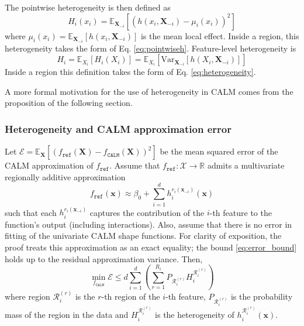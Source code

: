 The pointwise heterogeneity is then defined as 
\begin{equation}
H_i(x_i) = \mathbb{E}_{\mathbf{X}_{-i}}\left[\left(h(x_i, \mathbf{X}_{-i}) - \mu_i(x_i)\right)^2\right]
\end{equation}
where $\mu_i(x_i) = \mathbb{E}_{\mathbf{X}_{-i}}[h(x_i, \mathbf{X}_{-i})]$ is the mean local effect. Inside a region, this heterogeneity takes the form of Eq. \eqref{eq:pointwiseh}. Feature-level heterogeneity is 
\begin{equation}
H_i = \mathbb{E}_{X_i}\left[H_i(X_i)\right] = \mathbb{E}_{X_i}\left[\text{Var}_{\mathbf{X}_{-i}}[h(X_i, \mathbf{X}_{-i})]\right]
\end{equation}
Inside a region this definition takes the form of Eq. \eqref{eq:heterogeneity}.

A more formal motivation for the use of heterogeneity in CALM comes from the proposition of the following section.

\subsubsection{Heterogeneity and CALM approximation error}

\begin{proposition}
    Let $\mathcal{E} = \mathbb{E}_{\mathbf{X}}\left[\left(f_{\texttt{ref}}(\mathbf{X}) - f_{\texttt{CALM}}(\mathbf{X})\right)^2\right]$ be the mean squared error of the CALM approximation of $f_{\texttt{ref}}$. Assume that $f_{\texttt{ref}}: \mathcal{X} \to \mathbb{R}$ admits a multivariate regionally additive approximation
\begin{equation*}
f_{\texttt{ref}}(\mathbf{x}) \approx \beta_0 + \sum_{i = 1}^dh_i^{r_i(\mathbf{x}_{-i})}(\mathbf{x})
\end{equation*}
such that each $h_i^{r_i(\mathbf{x}_{-i})}$ captures the contribution of the $i$-th feature to the function's output (including interactions). Also, assume that there is no error in fitting of the univariate CALM shape functions. For clarity of exposition, the proof treats this approximation as an exact equality; the bound \eqref{eq:error_bound} holds up to the residual approximation variance. Then,
\begin{equation}
\min_{f_{\texttt{CALM}}} \mathcal{E} \leq d\sum_{i=1}^{d}\left(\sum_{r=1}^{R_i}P_{\mathcal{R}_i^{(r)}}H^{\mathcal{R}_i^{(r)}}_i\right)
\label{eq:error_bound}
\end{equation}
where region $\mathcal{R}_i^{(r)}$ is the $r$-th region of the $i$-th feature, $P_{\mathcal{R}_i^{(r)}}$ is the probability mass of the region in the data and $H^{\mathcal{R}_i^{(r)}}_i$ is the heterogeneity of $h_i^{\mathcal{R}_i^{(r)}}(\mathbf{x})$.
\label{prop:step2}
\end{proposition}

